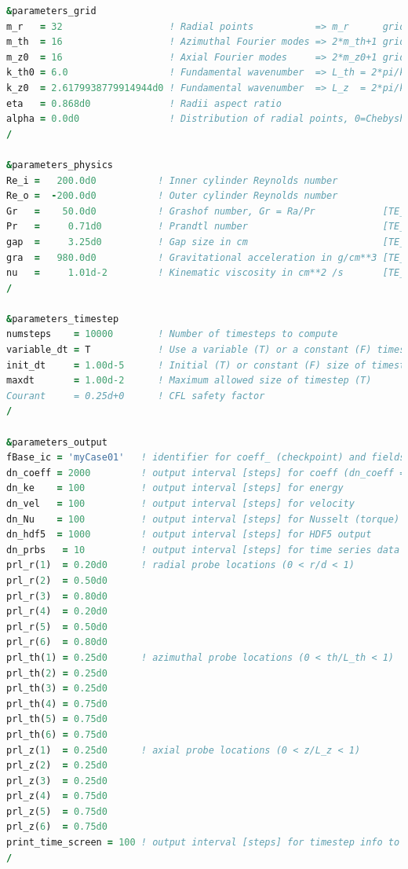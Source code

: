 \documentclass[a4paper, 11pt, DIV=11]{scrartcl}
\begin{document}
\begin{lstlisting}[language=fortran]
&parameters_grid
m_r   = 32                   ! Radial points           => m_r      grid points
m_th  = 16                   ! Azimuthal Fourier modes => 2*m_th+1 grid points
m_z0  = 16                   ! Axial Fourier modes     => 2*m_z0+1 grid points
k_th0 = 6.0                  ! Fundamental wavenumber  => L_th = 2*pi/k_th0
k_z0  = 2.6179938779914944d0 ! Fundamental wavenumber  => L_z  = 2*pi/k_z0
eta   = 0.868d0              ! Radii aspect ratio
alpha = 0.0d0                ! Distribution of radial points, 0=Chebyshev, 1=uniform, alpha<0 read from file
/

&parameters_physics
Re_i =   200.0d0           ! Inner cylinder Reynolds number
Re_o =  -200.0d0           ! Outer cylinder Reynolds number
Gr   =    50.0d0           ! Grashof number, Gr = Ra/Pr            [TE_CODE only]
Pr   =     0.71d0          ! Prandtl number                        [TE_CODE only]
gap  =     3.25d0          ! Gap size in cm                        [TE_CODE only]
gra  =   980.0d0           ! Gravitational acceleration in g/cm**3 [TE_CODE only]
nu   =     1.01d-2         ! Kinematic viscosity in cm**2 /s       [TE_CODE only]
/

&parameters_timestep
numsteps    = 10000        ! Number of timesteps to compute
variable_dt = T            ! Use a variable (T) or a constant (F) timestep size
init_dt     = 1.00d-5      ! Initial (T) or constant (F) size of timestep
maxdt       = 1.00d-2      ! Maximum allowed size of timestep (T)
Courant     = 0.25d+0      ! CFL safety factor
/

&parameters_output
fBase_ic = 'myCase01'   ! identifier for coeff_ (checkpoint) and fields_ (hdf5) files
dn_coeff = 2000         ! output interval [steps] for coeff (dn_coeff =-1 disables output)
dn_ke    = 100          ! output interval [steps] for energy
dn_vel   = 100          ! output interval [steps] for velocity
dn_Nu    = 100          ! output interval [steps] for Nusselt (torque)
dn_hdf5  = 1000         ! output interval [steps] for HDF5 output
dn_prbs   = 10          ! output interval [steps] for time series data at probe locations
prl_r(1)  = 0.20d0      ! radial probe locations (0 < r/d < 1)
prl_r(2)  = 0.50d0
prl_r(3)  = 0.80d0
prl_r(4)  = 0.20d0
prl_r(5)  = 0.50d0
prl_r(6)  = 0.80d0
prl_th(1) = 0.25d0      ! azimuthal probe locations (0 < th/L_th < 1)
prl_th(2) = 0.25d0
prl_th(3) = 0.25d0
prl_th(4) = 0.75d0
prl_th(5) = 0.75d0
prl_th(6) = 0.75d0
prl_z(1)  = 0.25d0      ! axial probe locations (0 < z/L_z < 1)
prl_z(2)  = 0.25d0
prl_z(3)  = 0.25d0
prl_z(4)  = 0.75d0
prl_z(5)  = 0.75d0
prl_z(6)  = 0.75d0
print_time_screen = 100 ! output interval [steps] for timestep info to stdout
/


\end{lstlisting}
\end{document}
